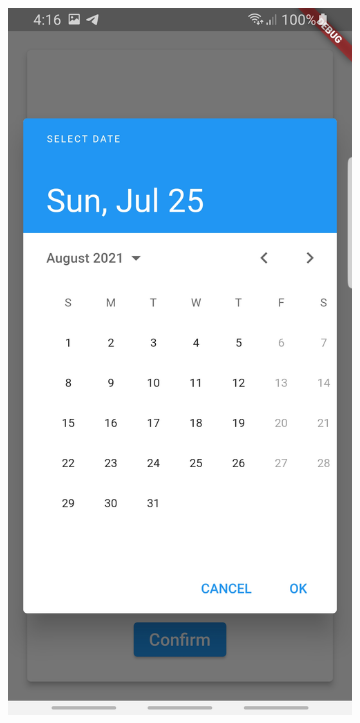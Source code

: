 \begin{figure}
\begin{subfigure}{.31\textwidth}
  \label{fig:sub-fourth}
\end{subfigure}
\begin{subfigure}{.31\textwidth}
  \centering
  \includegraphics[width=1\linewidth]{images1/ques6.jpg}  

\end{subfigure}
\end{figure}
